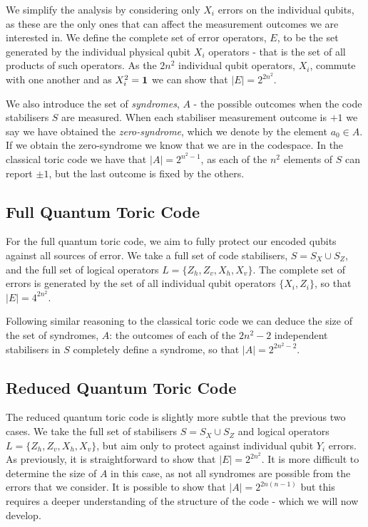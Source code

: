 We simplify the analysis by considering only $X_i$ errors on the individual qubits, as these are the only ones that can affect the measurement outcomes we are interested in. We define the complete set of error operators, $E$, to be the set generated by the individual physical qubit $X_i$ operators - that is the set of all products of such operators. As the $2n^2$ individual qubit operators, $X_i$, commute with one another and as $X_i^2 = \mathbf{1}$ we can show that $|E| = 2^{2n^2}$.

We also introduce the set of \textit{syndromes}, $A$ - the possible outcomes when the code stabilisers $S$ are measured. When each stabiliser measurement outcome is $+1$ we say we have obtained the \textit{zero-syndrome}, which we denote by the element $a_0 \in A$. If we obtain the zero-syndrome we know that we are in the codespace. In the classical toric code we have that $|A| = 2^{n^2-1}$, as each of the $n^2$ elements of $S$ can report $\pm 1$, but the last outcome is fixed by the others.

\subsection{Full Quantum Toric Code}

For the full quantum toric code, we aim to fully protect our encoded qubits against all sources of error. We take a full set of code stabilisers, $S = S_X \cup S_Z$, and the full set of logical operators $L = \{Z_h, Z_v, X_h, X_v\}$. The complete set of errors is generated by the set of all individual qubit operators $\{X_i, Z_i\}$, so that $|E| = 4^{2n^2}$.

Following similar reasoning to the classical toric code we can deduce the size of the set of syndromes, $A$: the outcomes of each of the $2n^2 - 2$ independent stabilisers in $S$ completely define a syndrome, so that $|A| = 2^{2n^2-2}$.

\subsection{Reduced Quantum Toric Code}

The reduced quantum toric code is slightly more subtle that the previous two cases. We take the full set of stabilisers $S = S_X \cup S_Z$ and logical operators $L = \{Z_h, Z_v, X_h, X_v\}$, but aim only to protect against individual qubit $Y_i$ errors. As previously, it is straightforward to show that $|E| = 2^{2n^2}$. It is more difficult to determine the size of $A$ in this case, as not all syndromes are possible from the errors that we consider. It is possible to show that $|A| = 2^{2n(n-1)}$ but this requires a deeper understanding of the structure of the code - which we will now develop.

